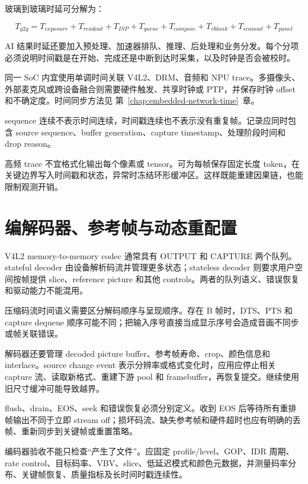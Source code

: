 玻璃到玻璃时延可分解为：

\begin{equation}
  T_{g2g}=T_{exposure}+T_{readout}+T_{ISP}+T_{queue}
  +T_{compose}+T_{vblank}+T_{scanout}+T_{panel}
\end{equation}

AI 结果时延还要加入预处理、加速器排队、推理、后处理和业务分发。每个分项必须说明时间戳是在开始、完成还是中断到达时采集，以及时钟是否会被校时。

同一 SoC 内宜使用单调时间关联 V4L2、DRM、音频和 NPU trace。多摄像头、外部麦克风或跨设备融合则需要硬件触发、共享时钟或 PTP，并保存时钟 offset 和不确定度。时间同步方法见 \mbox{第~\ref{chap:embedded-network-time}~章}。

sequence 连续不表示时间连续，时间戳连续也不表示没有重复帧。记录应同时包含 source sequence、buffer generation、capture timestamp、处理阶段时间和 drop reason。

高频 trace 不宜格式化输出每个像素或 tensor。可为每帧保存固定长度 token，在关键边界写入时间戳和状态，异常时冻结环形缓冲区。这样既能重建因果链，也能限制观测开销。

\section{编解码器、参考帧与动态重配置}

V4L2 memory-to-memory codec 通常具有 OUTPUT 和 CAPTURE 两个队列。stateful decoder 由设备解析码流并管理更多状态；stateless decoder 则要求用户空间按帧提供 slice、reference picture 和其他 controls。两者的队列语义、错误恢复和驱动能力不能混用\cite{linux-media-api}。

压缩码流时间语义需要区分解码顺序与呈现顺序。存在 B 帧时，DTS、PTS 和 capture dequeue 顺序可能不同；把输入序号直接当成显示序号会造成音画不同步或帧关联错误。

解码器还要管理 decoded picture buffer、参考帧寿命、crop、颜色信息和 interlace。source change event 表示分辨率或格式变化时，应用应停止相关 capture 流、读取新格式、重建下游 pool 和 framebuffer，再恢复提交。继续使用旧尺寸缓冲可能导致越界。

flush、drain、EOS、seek 和错误恢复必须分别定义。收到 EOS 后等待所有重排帧输出不同于立即 stream off；损坏码流、缺失参考帧和硬件超时也应有明确的丢帧、重新同步到关键帧或重置策略。

编码器验收不能只检查“产生了文件”。应固定 profile/level、GOP、IDR 周期、rate control、目标码率、VBV、slice、低延迟模式和颜色元数据，并测量码率分布、关键帧恢复、质量指标及长时间时戳连续性。

